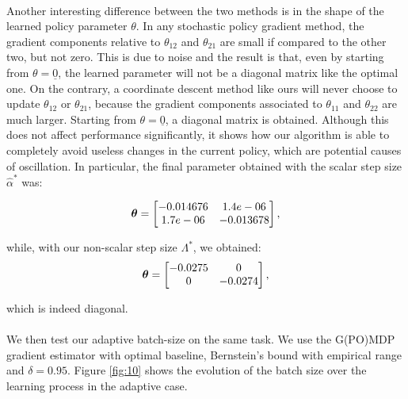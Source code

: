 \paragraph{}
Another interesting difference between the two methods is in the shape of the learned policy parameter $\theta$. In any stochastic policy gradient method, the gradient components relative to $\theta_{12}$ and $\theta_{21}$ are small if compared to the other two, but not zero. This is due to noise and the result is that, even by starting from $\theta = \underline{0}$, the learned parameter will not be a diagonal matrix like the optimal one. On the contrary, a coordinate descent method like ours will never choose to update $\theta_{12}$ or $\theta_{21}$, because the gradient components associated to $\theta_{11}$ and $\theta_{22}$ are much larger. Starting from $\theta = \underline{0}$, a diagonal matrix is obtained.
Although this does not affect performance significantly, it shows how our algorithm is able to completely avoid useless changes in the current policy, which are potential causes of oscillation. In particular, the final parameter obtained with the scalar step size $\hat{\alpha}^*$ was:

\[
\boldsymbol{\theta} = \begin{bmatrix}
	-0.014676 & 1.4e-06 \\
	 1.7e-06  & -0.013678
	\end{bmatrix},
\]

while, with our non-scalar step size $\Lambda^*$, we obtained:
\[
\boldsymbol{\theta} = \begin{bmatrix}
	-0.0275 & 0 \\
	 0  & -0.0274
	\end{bmatrix},
\]

which is indeed diagonal.

\paragraph{}
We then test our adaptive batch-size on the same task. We use the G(PO)MDP gradient estimator with optimal baseline, Bernstein's bound with empirical range and $\delta=0.95$.
Figure \ref{fig:10} shows the evolution of the batch size over the learning process in the adaptive case.

